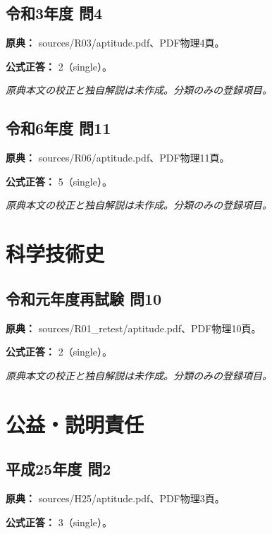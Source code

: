 \subsection{令和3年度 問4}
\label{q:r03-reg-apt-04}

\noindent\textbf{原典：} sources/R03/aptitude.pdf、PDF物理4頁。

\textbf{公式正答：} 2（single）。

\par\textit{原典本文の校正と独自解説は未作成。分類のみの登録項目。}

\subsection{令和6年度 問11}
\label{q:r06-reg-apt-11}

\noindent\textbf{原典：} sources/R06/aptitude.pdf、PDF物理11頁。

\textbf{公式正答：} 5（single）。

\par\textit{原典本文の校正と独自解説は未作成。分類のみの登録項目。}

\section{科学技術史}

\subsection{令和元年度再試験 問10}
\label{q:r01-ret-apt-10}

\noindent\textbf{原典：} sources/R01\_retest/aptitude.pdf、PDF物理10頁。

\textbf{公式正答：} 2（single）。

\par\textit{原典本文の校正と独自解説は未作成。分類のみの登録項目。}

\section{公益・説明責任}

\subsection{平成25年度 問2}
\label{q:h25-reg-apt-02}

\noindent\textbf{原典：} sources/H25/aptitude.pdf、PDF物理3頁。

\textbf{公式正答：} 3（single）。

